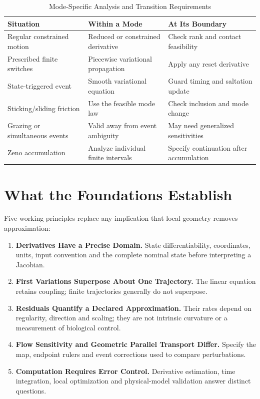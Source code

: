 \begin{table}[htbp]
\centering
\caption{Mode-Specific Analysis and Transition Requirements}
\label{tab:ch1:scope}
\begin{tabular}{@{}>{\raggedright\arraybackslash}p{.26\linewidth}>{\raggedright\arraybackslash}p{.31\linewidth}>{\raggedright\arraybackslash}p{.35\linewidth}@{}}
\toprule
Situation & Within a Mode & At Its Boundary \\
\midrule
Regular constrained motion & Reduced or constrained derivative & Check rank and contact feasibility \\
Prescribed finite switches & Piecewise variational propagation & Apply any reset derivative \\
State-triggered event & Smooth variational equation & Guard timing and saltation update \\
Sticking/sliding friction & Use the feasible mode law & Check inclusion and mode change \\
Grazing or simultaneous events & Valid away from event ambiguity & May need generalized sensitivities \\
Zeno accumulation & Analyze individual finite intervals & Specify continuation after accumulation \\
\bottomrule
\end{tabular}
\end{table}

\section{What the Foundations Establish}

Five working principles replace any implication that local geometry removes approximation:
\begin{enumerate}[itemsep=3pt,topsep=4pt]
\item \textbf{Derivatives Have a Precise Domain.} State differentiability, coordinates, units,
input convention and the complete nominal state before interpreting a Jacobian.
\item \textbf{First Variations Superpose About One Trajectory.} The linear equation retains
coupling; finite trajectories generally do not superpose.
\item \textbf{Residuals Quantify a Declared Approximation.} Their rates depend on regularity,
direction and scaling; they are not intrinsic curvature or a measurement of biological control.
\item \textbf{Flow Sensitivity and Geometric Parallel Transport Differ.} Specify the map,
endpoint rulers and event corrections used to compare perturbations.
\item \textbf{Computation Requires Error Control.} Derivative estimation, time integration,
local optimization and physical-model validation answer distinct questions.
\end{enumerate}


